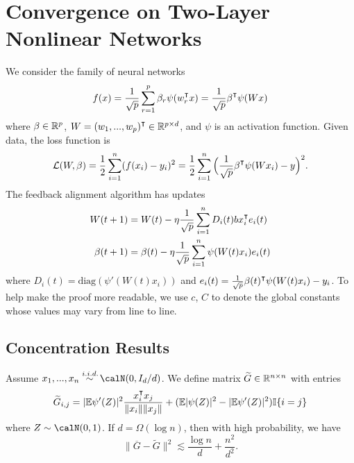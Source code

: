 
\section{Convergence on Two-Layer Nonlinear Networks}\label{sec:appendix-convergence}
We consider the family of neural networks
\begin{equation}
f(x) = \frac{1}{\sqrt p}\sum_{r=1}^p \beta_r \psi(w_r\transpose x) = \frac{1}{\sqrt p}\beta\transpose \psi(Wx)
\end{equation}
where $\beta \in \mathbb{R}^p$, $W = (w_1,...,w_p)\transpose\in\R^{p\times d}$, and $\psi$ is an activation function. Given data, the loss function is
\begin{equation}
\Loss(W, \beta) = \frac{1}{2}\sum_{i=1}^n(f(x_i)-y_i)^2 = \frac{1}{2}\sum_{i=1}^n\Big(\frac{1}{\sqrt p}\beta\transpose \psi(Wx_i)-y\Big)^2.
\end{equation}
The feedback alignment algorithm has updates
\begin{equation}
\label{eq:updates}
\begin{aligned}
    W(t+1) &= W(t) - \eta\frac{1}{\sqrt p}\sum_{i=1}^nD_i(t)bx_i\transpose e_i(t) \\
    \beta(t+1) &= \beta(t)- \eta \frac{1}{\sqrt p}\sum_{i=1}^n \psi(W(t)x_i)e_i(t)
\end{aligned}
\end{equation}
where $D_i(t) = \text{diag}(\psi'(W(t)x_i))$ and $e_i(t) = \frac{1}{\sqrt p}\beta(t)\transpose \psi(W(t)x_i)-y_i$. To help make the proof more readable, we use $c$, $C$ to denote the global constants whose values may vary from line to line.

\subsection{Concentration Results}

\begin{lemma}\label{lma:G}
Assume $x_1,...,x_n \overset{\iid}{\sim} \calN(0,I_d/d)$. We define  matrix $\widetilde{G}\in \mathbb{R}^{n\times n}$ with entries
\begin{equation*}
    \widetilde{G}_{i,j} = |\E\psi'(Z)|^2 \frac{x_i\transpose x_j}{\|x_i\|\|x_j\|} + (\E|\psi(Z)|^2-|\E\psi'(Z)|^2)\I\{i=j\}
\end{equation*}
where $Z\sim \calN(0,1)$. If $d = \Omega(\log n)$, then with high probability, we have
\begin{equation*}
\|\overline{G}-\widetilde{G}\|^2 \lesssim \frac{\log n}{d} + \frac{n^2}{d^2}.
\end{equation*}
\end{lemma}


